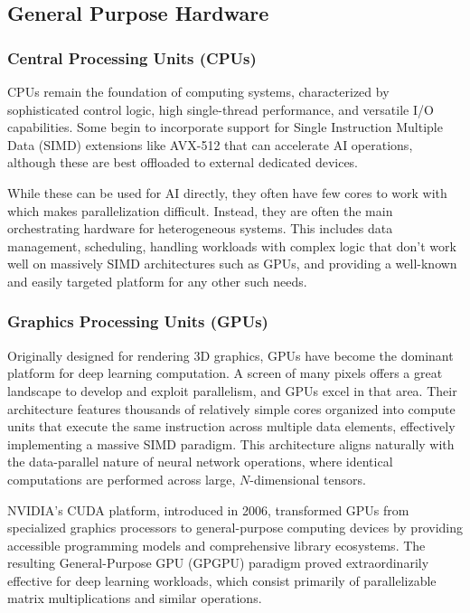 \documentclass[manuscript,screen,review,format=acmsmall]{acmart}
\begin{document}
\subsection{General Purpose Hardware}

\subsubsection{Central Processing Units (CPUs)}

CPUs remain the foundation of computing systems, characterized by sophisticated control logic, high single-thread performance, and versatile I/O capabilities. Some begin to incorporate support for Single Instruction Multiple Data (SIMD) extensions like AVX-512 that can accelerate AI operations, although these are best offloaded to external dedicated devices.

While these can be used for AI directly, they often have few cores to work with which makes parallelization difficult. Instead, they are often the main orchestrating hardware for heterogeneous systems. This includes data management, scheduling, handling workloads with complex logic that don't work well on massively SIMD architectures such as GPUs, and providing a well-known and easily targeted platform for any other such needs.

\subsubsection{Graphics Processing Units (GPUs)}

Originally designed for rendering 3D graphics, GPUs have become the dominant platform for deep learning computation. A screen of many pixels offers a great landscape to develop and exploit parallelism, and GPUs excel in that area. Their architecture features thousands of relatively simple cores organized into compute units that execute the same instruction across multiple data elements, effectively implementing a massive SIMD paradigm. This architecture aligns naturally with the data-parallel nature of neural network operations, where identical computations are performed across large, $N$-dimensional tensors.

NVIDIA's CUDA platform, introduced in 2006, transformed GPUs from specialized graphics processors to general-purpose computing devices by providing accessible programming models and comprehensive library ecosystems. The resulting General-Purpose GPU (GPGPU) paradigm proved extraordinarily effective for deep learning workloads, which consist primarily of parallelizable matrix multiplications and similar operations.
\end{document}
